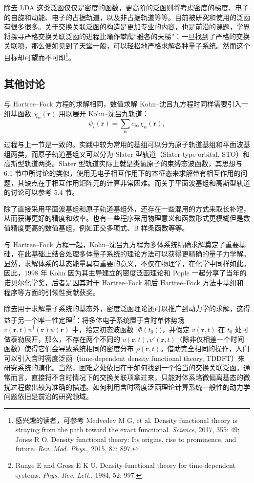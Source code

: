 除去 LDA 这类泛函仅仅是密度的函数，更高阶的泛函则将考虑密度的梯度、电子的自旋和动能、电子的占据轨道，以及非占据轨道等等。目前被研究和使用的泛函有很多很多。关于交换关联泛函的构造是更加专业的内容，也是前沿的课题，学界将探寻严格交换关联泛函的进程比喻作攀爬“雅各的天梯”：一旦找到了严格的交换关联项，那么便如见到了天堂一般，可以轻松地严格求解各种量子系统。然而这个目标却可望而不可即\footnote{感兴趣的读者，可参考 Medvedev M G, et al. Density functional theory is straying from the path toward the exact functional. \emph{Science}, 2017, 355: 49; Jones R O. Density functional theory: Its origins, rise to prominence, and future. \emph{Rev. Mod. Phys.}, 2015, 87: 897.}。

\subsection{其他讨论}

与 Hartree--Fock 方程的求解相同，数值求解 Kohn--沈吕九方程时同样需要引入一组基函数 $\chi_\alpha(\bm r)$ 用以展开 Kohn--沈吕九轨道：
\begin{equation}
 \psi_i(\bm r)=\sum_\alpha c_{i\alpha}\chi_\alpha(\bm r),
\tag{6.5.15}
\end{equation}

过程与上一节是一致的。实践中较为常用的基组可以分为原子轨道基组和平面波基组两类，而原子轨道基组又可以分为 Slater 型轨道（Slater type orbital, STO）和高斯型轨道两类。Slater 型轨道实际上就是类氢原子的束缚态波函数，其思想与 6.1 节中所讨论的类似，使用无电子相互作用下的本征态来求解带有相互作用的问题，其缺点在于相互作用矩阵元的计算非常困难。而关于平面波基组和高斯型轨道的讨论可以参考 5.4 节。

除了直接采用平面波基组和原子轨道基组外，还存在一些混用的方式来取长补短，从而获得更好的精度和效率。也有一些程序采用物理意义和函数形式更模糊但是数值精度更高的数值基组，例如正交多项式、B 样条函数等等。

与 Hartree--Fock 方程一起，Kohn--沈吕九方程为多体系统精确求解奠定了重要基础，在此基础上结合处理多体量子系统的理论方法可以获得更精确的量子力学解。显然，求解体系的基态能量具有重要的意义，不仅在物理学，在化学中同样如此。因此，1998 年 Kohn 因为其主导建立的密度泛函理论和 Pople 一起分享了当年的诺贝尔化学奖，后者是因其对于 Hartree--Fock 和后 Hartree--Fock 方法中基组和程序等方面的引领性贡献获奖。

除去用于求解量子系统的基态外，密度泛函理论还可以推广到动力学的求解，这得益于另一个唯一性定理\footnote{Runge E and Gross E K U. Density-functional theory for time-dependent systems. \emph{Phys. Rev. Lett.}, 1984, 52: 997.}：将多体电子系统置于含时单体势场 $v(\bm r,t)\psi^\dagger(\bm r)\psi(\bm r)$ 中，给定初态波函数 $|\Phi(t_0)\rangle$，并假定 $v(\bm r,t)$ 在 $t_0$ 处可做泰勒展开，那么，不存在两个不同的 $v(\bm r,t),v'(\bm r,t)$（除非仅相差一个时间函数）使得它们会导致系统相同的密度分布 $\rho(\bm r,t)$。借助完全相同的操作，人们可以引入含时密度泛函（time-dependent density functional theory, TDDFT）来研究系统的演化。当然，困难之处依旧在于如何找到一个恰当的交换关联泛函。通常而言，直接将不含时情况下的交换关联项拿过来，只能对体系略微偏离基态的微扰过程做出较为准确的描述。如何利用含时密度泛函理论计算系统一般性的动力学问题依旧是前沿的研究领域。

